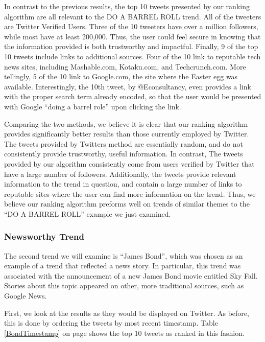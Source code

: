 \documentclass[10pt]{proc}
\begin{document}
  In contrast to the previous results, the top 10 tweets presented by our ranking algorithm are all relevant to the DO A BARREL ROLL trend. All of the tweeters are Twitter Verified Users. Three of the 10 tweeters have over a million followers, while most have at least 200,000. Thus, the user could feel secure in knowing that the information provided is both trustworthy and impactful. Finally, 9 of the top 10 tweets include links to additional sources. Four of the 10 link to reputable tech news sites, including Mashable.com, Kotaku.com, and Techcrunch.com. More tellingly, 5 of the 10 link to Google.com, the site where the Easter egg was available. Interestingly, the 10th tweet, by @Econsultancy, even provides a link with the proper search term already encoded, so that the user would be presented with Google ``doing a barrel role'' upon clicking the link.

    Comparing the two methods, we believe it is clear that our ranking algorithm provides significantly better results than those currently employed by Twitter. The tweets provided by Twitters method are essentially random, and do not consistently provide trustworthy, useful information. In contrast, The tweets provided by our algorithm consistently come from users verified by Twitter that have a large number of followers. Additionally, the tweets provide relevant information to the trend in question, and contain a large number of links to reputable sites where the user can find more information on the trend. Thus, we believe our ranking algorithm preforms well on trends of similar themes to the ``DO A BARREL ROLL'' example we just examined.

    \subsubsection{Newsworthy Trend}
    The second trend we will examine is ``James Bond'', which was chosen as an example of a trend that reflected a news story. In particular, this trend was associated with the announcement of a new James Bond movie entitled Sky Fall. Stories about this topic appeared on other, more traditional sources, such as Google News.

    First, we look at the results as they would be displayed on Twitter. As before, this is done by ordering the tweets by most recent timestamp. Table \ref{BondTimestamp} on page \pageref{BondTimestamp} shows the top 10 tweets as ranked in this fashion.
\end{document}
